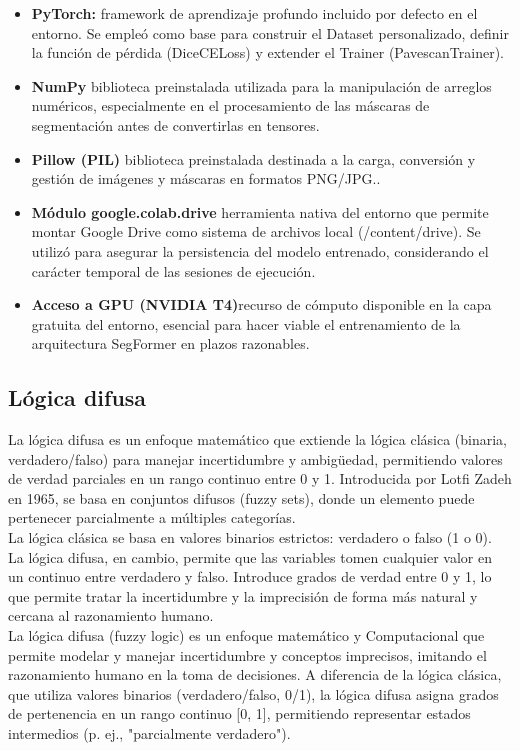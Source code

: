 \begin{itemize}
	\item \textbf{PyTorch:} framework de aprendizaje profundo incluido por defecto en el entorno. Se empleó como base para construir el Dataset personalizado, definir la función de pérdida (DiceCELoss) y extender el Trainer (PavescanTrainer).
	\item \textbf{NumPy} biblioteca preinstalada utilizada para la manipulación de arreglos numéricos, especialmente en el procesamiento de las máscaras de segmentación antes de convertirlas en tensores.
	\item \textbf{Pillow (PIL) }biblioteca preinstalada destinada a la carga, conversión y gestión de imágenes y máscaras en formatos PNG/JPG..
	\item \textbf{Módulo google.colab.drive} herramienta nativa del entorno que permite montar Google Drive como sistema de archivos local (/content/drive). Se utilizó para asegurar la persistencia del modelo entrenado, considerando el carácter temporal de las sesiones de ejecución.
	\item \textbf{Acceso a GPU (NVIDIA T4)}recurso de cómputo disponible en la capa gratuita del entorno, esencial para hacer viable el entrenamiento de la arquitectura SegFormer en plazos razonables.
\end{itemize}



\subsection{Lógica difusa}
La lógica difusa es un enfoque matemático que extiende la lógica clásica (binaria, verdadero/falso) para manejar incertidumbre y ambigüedad, permitiendo valores de verdad parciales en un rango continuo entre 0 y 1. Introducida por Lotfi Zadeh en 1965, se basa en conjuntos difusos (fuzzy sets), donde un elemento puede pertenecer parcialmente a múltiples categorías.\\
La lógica clásica se basa en valores binarios estrictos: verdadero o falso (1 o 0). La lógica difusa, en cambio, permite que las variables tomen cualquier valor en un continuo entre verdadero y falso. Introduce grados de verdad entre 0 y 1, lo que permite tratar la incertidumbre y la imprecisión de forma más natural y cercana al razonamiento humano.\\
\textcite{Tsegfomer2018} La lógica difusa (fuzzy logic) es un enfoque matemático y Computacional que permite modelar y manejar incertidumbre y conceptos imprecisos, imitando el razonamiento humano en la toma de decisiones. A diferencia de la lógica clásica, que utiliza valores binarios (verdadero/falso, 0/1), la lógica difusa asigna grados de pertenencia en un rango continuo [0, 1], permitiendo representar estados intermedios (p. ej., "parcialmente verdadero").

